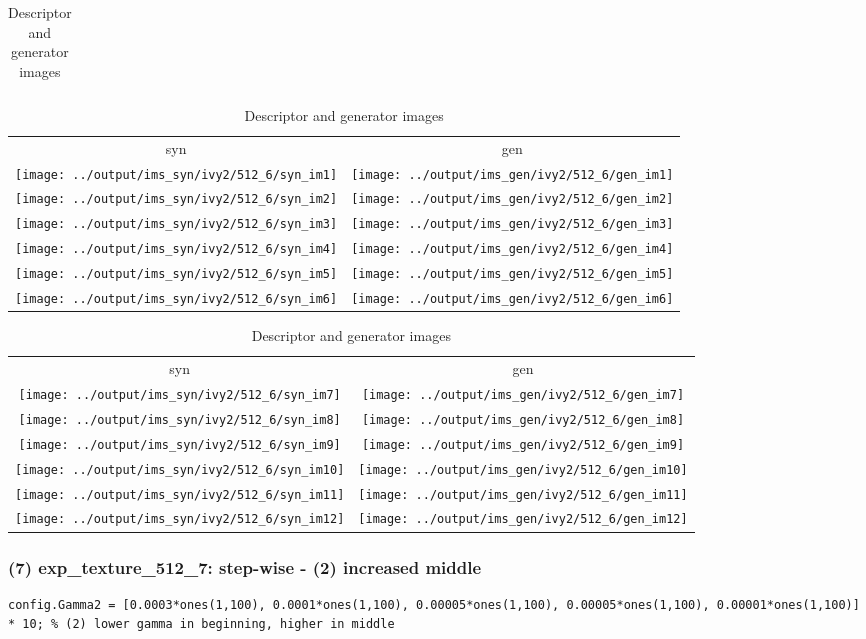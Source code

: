 \documentclass[letter]{article}
\begin{document}
\begin{table}[h!]
\begin{tabular}{c}
	\end{tabular}
	\begin{tabular}{cc}
		syn & gen\tabularnewline
		\texttt{[image: ../output/ims\_syn/ivy2/512\_6/syn\_im1]} & \texttt{[image: ../output/ims\_gen/ivy2/512\_6/gen\_im1]} \tabularnewline
		\texttt{[image: ../output/ims\_syn/ivy2/512\_6/syn\_im2]} & \texttt{[image: ../output/ims\_gen/ivy2/512\_6/gen\_im2]} \tabularnewline
		\texttt{[image: ../output/ims\_syn/ivy2/512\_6/syn\_im3]} & \texttt{[image: ../output/ims\_gen/ivy2/512\_6/gen\_im3]} \tabularnewline
		\texttt{[image: ../output/ims\_syn/ivy2/512\_6/syn\_im4]} & \texttt{[image: ../output/ims\_gen/ivy2/512\_6/gen\_im4]} \tabularnewline
		\texttt{[image: ../output/ims\_syn/ivy2/512\_6/syn\_im5]} & \texttt{[image: ../output/ims\_gen/ivy2/512\_6/gen\_im5]} \tabularnewline
		\texttt{[image: ../output/ims\_syn/ivy2/512\_6/syn\_im6]} & \texttt{[image: ../output/ims\_gen/ivy2/512\_6/gen\_im6]} \tabularnewline
	\end{tabular}
	\begin{tabular}{cc}
		syn & gen\tabularnewline
		\texttt{[image: ../output/ims\_syn/ivy2/512\_6/syn\_im7]} & \texttt{[image: ../output/ims\_gen/ivy2/512\_6/gen\_im7]} \tabularnewline
		\texttt{[image: ../output/ims\_syn/ivy2/512\_6/syn\_im8]} & \texttt{[image: ../output/ims\_gen/ivy2/512\_6/gen\_im8]} \tabularnewline
		\texttt{[image: ../output/ims\_syn/ivy2/512\_6/syn\_im9]} & \texttt{[image: ../output/ims\_gen/ivy2/512\_6/gen\_im9]} \tabularnewline
		\texttt{[image: ../output/ims\_syn/ivy2/512\_6/syn\_im10]} & \texttt{[image: ../output/ims\_gen/ivy2/512\_6/gen\_im10]} \tabularnewline
		\texttt{[image: ../output/ims\_syn/ivy2/512\_6/syn\_im11]} & \texttt{[image: ../output/ims\_gen/ivy2/512\_6/gen\_im11]} \tabularnewline
		\texttt{[image: ../output/ims\_syn/ivy2/512\_6/syn\_im12]} & \texttt{[image: ../output/ims\_gen/ivy2/512\_6/gen\_im12]} \tabularnewline
	\end{tabular}
	\caption{Descriptor and generator images}
\end{table}
\newpage

\subsubsection*{(7) exp\_texture\_512\_7: step-wise - (2) increased middle}

\begin{lstlisting}
config.Gamma2 = [0.0003*ones(1,100), 0.0001*ones(1,100), 0.00005*ones(1,100), 0.00005*ones(1,100), 0.00001*ones(1,100)] * 10; % (2) lower gamma in beginning, higher in middle 

\end{lstlisting}
\end{document}
